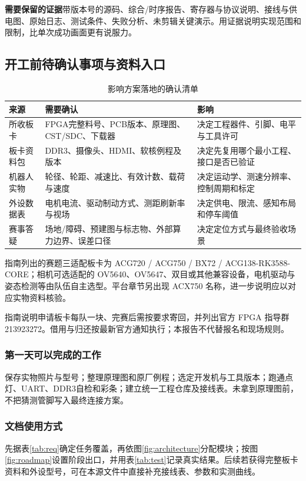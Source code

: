 \documentclass[UTF8,a4paper,zihao=-4,fontset=fandol]{ctexart}
\newcommand{\note}[2]{\par\smallskip\noindent\colorbox{Pale}{\parbox{\dimexpr\linewidth-2\fboxsep\relax}{\small\textbf{\color{Teal}#1}\quad #2}}\par\smallskip}
\newcommand{\nextpage}{\clearpage}
\begin{document}
\note{需要保留的证据}{带版本号的源码、综合/时序报告、寄存器与协议说明、接线与供电图、原始日志、测试条件、失败分析、未剪辑关键演示。用证据说明实现范围和限制，比单次成功画面更有说服力。}

\nextpage
\subsection{开工前待确认事项与资料入口}

\begin{table}[H]\small
\caption{影响方案落地的确认清单}
\begin{tabularx}{\linewidth}{@{}L{2.4cm}Y Y@{}}\toprule
\textbf{来源} & \textbf{需要确认} & \textbf{影响}\\\midrule
所收板卡 & FPGA完整料号、PCB版本、原理图、CST/SDC、下载器 & 决定工程器件、引脚、电平与工具许可\\
板卡资料包 & DDR3、摄像头、HDMI、软核例程及版本 & 决定先复用哪个最小工程、接口是否已验证\\
机器人实物 & 轮径、轮距、减速比、有效计数、载荷与速度 & 决定运动学、测速分辨率、控制周期和标定\\
外设数据表 & 电机电流、驱动制动方式、测距刷新率与视场 & 决定供电、限流、感知布局和停车阈值\\
赛事答疑 & 场地/障碍、预建图与标志物、外部算力边界、误差口径 & 决定定位方式与最终验收场景\\\bottomrule
\end{tabularx}
\end{table}

指南列出的赛题三适配板卡为 ACG720 / ACG750 / BX72 / ACG138-RK3588-CORE；相机可选适配的 OV5640、OV5647、双目或其他兼容设备，电机驱动与姿态检测等由队伍自主选型。平台章节另出现 ACX750 名称，进一步说明应以对应实物资料核验。\cite{contest}

指南说明申请板卡每队一块、完赛后需按要求寄回，并列出官方 FPGA 指导群 213923272。借用与归还按最新官方通知执行；本报告不代替报名和现场规则。

\subsubsection{第一天可以完成的工作}
保存实物照片与型号；整理原理图和原厂例程；选定开发机与工具版本；跑通点灯、UART、DDR3自检和彩条；建立统一工程仓库及接线表。未拿到原理图前，不把猜测管脚写入最终连接方案。

\subsubsection{文档使用方式}
先据表\ref{tab:req}确定任务覆盖，再依图\ref{fig:architecture}分配模块；按图\ref{fig:roadmap}设置阶段出口，并用表\ref{tab:test}记录真实结果。后续若获得完整板卡资料和外设型号，可在本源文件中直接补充接线表、参数和实测曲线。
\end{document}
